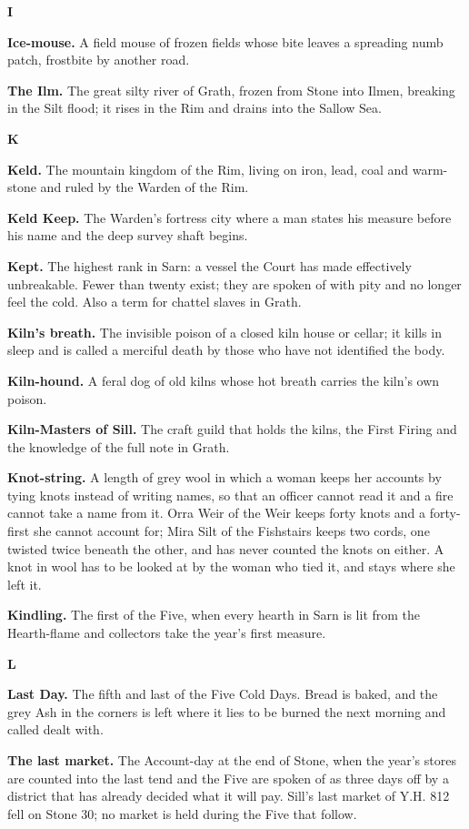 \documentclass{design/chronicle}
\begin{document}
\textbf{I}

\textbf{Ice-mouse.} A field mouse of frozen fields whose bite leaves a spreading numb patch, frostbite by another road.

\textbf{The Ilm.} The great silty river of Grath, frozen from Stone into Ilmen, breaking in the Silt flood; it rises in the Rim and drains into the Sallow Sea.

\textbf{K}

\textbf{Keld.} The mountain kingdom of the Rim, living on iron, lead, coal and warm-stone and ruled by the Warden of the Rim.

\textbf{Keld Keep.} The Warden’s fortress city where a man states his measure before his name and the deep survey shaft begins.

\textbf{Kept.} The highest rank in Sarn: a vessel the Court has made effectively unbreakable. Fewer than twenty exist; they are spoken of with pity and no longer feel the cold. Also a term for chattel slaves in Grath.

\textbf{Kiln’s breath.} The invisible poison of a closed kiln house or cellar; it kills in sleep and is called a merciful death by those who have not identified the body.

\textbf{Kiln-hound.} A feral dog of old kilns whose hot breath carries the kiln’s own poison.

\textbf{Kiln-Masters of Sill.} The craft guild that holds the kilns, the First Firing and the knowledge of the full note in Grath.

\textbf{Knot-string.} A length of grey wool in which a woman keeps her accounts by tying knots instead of writing names, so that an officer cannot read it and a fire cannot take a name from it. Orra Weir of the Weir keeps forty knots and a forty-first she cannot account for; Mira Silt of the Fishstairs keeps two cords, one twisted twice beneath the other, and has never counted the knots on either. A knot in wool has to be looked at by the woman who tied it, and stays where she left it.

\textbf{Kindling.} The first of the Five, when every hearth in Sarn is lit from the Hearth-flame and collectors take the year’s first measure.

\textbf{L}

\textbf{Last Day.} The fifth and last of the Five Cold Days. Bread is baked, and the grey Ash in the corners is left where it lies to be burned the next morning and called dealt with.

\textbf{The last market.} The Account-day at the end of Stone, when the year’s stores are counted into the last tend and the Five are spoken of as three days off by a district that has already decided what it will pay. Sill’s last market of Y.H. 812 fell on Stone 30; no market is held during the Five that follow.
\end{document}
